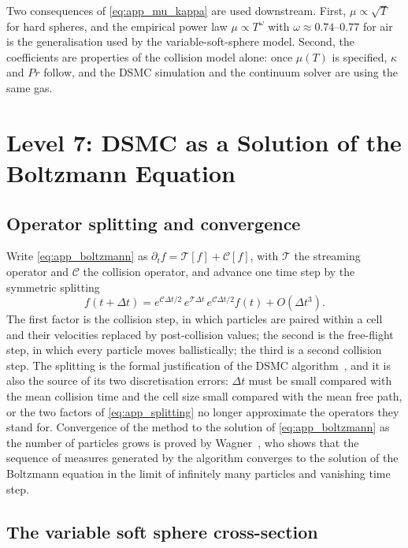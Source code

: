Two consequences of \eqref{eq:app_mu_kappa} are used downstream. First, $\mu \propto \sqrt{T}$ for hard spheres, and the empirical power law $\mu \propto T^{\omega}$ with $\omega \approx 0.74$--$0.77$ for air is the generalisation used by the variable-soft-sphere model. Second, the coefficients are properties of the collision model alone: once $\mu(T)$ is specified, $\kappa$ and $Pr$ follow, and the DSMC simulation and the continuum solver are using the same gas.

\section{Level 7: DSMC as a Solution of the Boltzmann Equation}
\label{app:dsmc}

\subsection{Operator splitting and convergence}

Write \eqref{eq:app_boltzmann} as $\partial_tf = \mathcal{T}[f] + \mathcal{C}[f]$, with $\mathcal{T}$ the streaming operator and $\mathcal{C}$ the collision operator, and advance one time step by the symmetric splitting
\begin{equation}
    f(t+\Delta t) = e^{\mathcal{C}\Delta t/2}\,e^{\mathcal{T}\Delta t}\,e^{\mathcal{C}\Delta t/2}f(t) + O(\Delta t^3) .
    \label{eq:app_splitting}
\end{equation}
The first factor is the collision step, in which particles are paired within a cell and their velocities replaced by post-collision values; the second is the free-flight step, in which every particle moves ballistically; the third is a second collision step. The splitting is the formal justification of the DSMC algorithm~\cite{bird1994molecular}, and it is also the source of its two discretisation errors: $\Delta t$ must be small compared with the mean collision time and the cell size small compared with the mean free path, or the two factors of \eqref{eq:app_splitting} no longer approximate the operators they stand for. Convergence of the method to the solution of \eqref{eq:app_boltzmann} as the number of particles grows is proved by Wagner~\cite{wagner1992}, who shows that the sequence of measures generated by the algorithm converges to the solution of the Boltzmann equation in the limit of infinitely many particles and vanishing time step.

\subsection{The variable soft sphere cross-section}
\label{app:vss}

